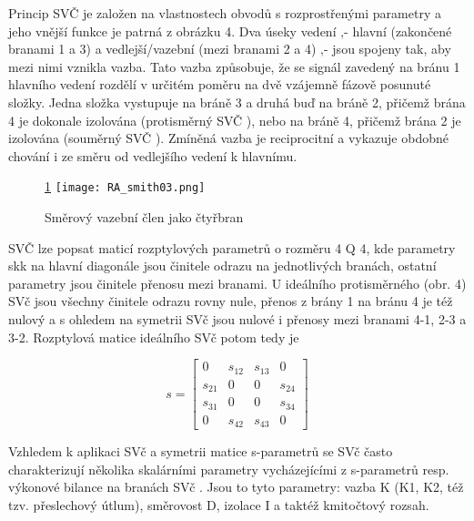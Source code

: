         Princip SVČ je založen na vlastnostech obvodů s rozprostřenými parametry a jeho vnější 
        funkce je patrná z obrázku 4. Dva úseky vedení ‚- hlavní (zakončené branami 1 a 3) a 
        vedlejší/vazební (mezi branami 2 a 4) ‚- jsou spojeny tak, aby mezi nimi vznikla vazba. 
        Tato vazba způsobuje, že se signál zavedený na bránu 1 hlavního vedení rozdělí v určitém 
        poměru na dvě vzájemně fázově posunuté složky. Jedna složka vystupuje na bráně 3 a druhá 
        buď na bráně 2, přičemž brána 4 je dokonale izolována (protisměrný SVČ ), nebo na bráně 4, 
        přičemž brána 2 je izolována (souměrný SVČ ). Zmíněná vazba je reciprocitní a vykazuje 
        obdobné chování i ze směru od vedlejšího vedení k hlavnímu.      
  
        \begin{figure}\ref{fyz:fig0_RA_smith03} 
          \centering
          \texttt{[image: RA\_smith03.png]}
          \caption{Směrový vazební člen jako čtyřbran}
          \label{fyz:fig0_RA_smith03} 
        \end{figure}
  
        SVČ lze popsat maticí rozptylových parametrů o rozměru 4 Q 4, kde parametry skk na hlavní 
        diagonále jsou činitele odrazu na jednotlivých branách, ostatní parametry jsou činitele 
        přenosu mezi branami. U ideálního protisměrného (obr. 4) SVč jsou všechny činitele odrazu 
        rovny nule, přenos z brány 1 na bránu 4 je též nulový a s ohledem na symetrii SVč jsou 
        nulové i přenosy mezi branami 4-1, 2-3 a 3-2. Rozptylová matice ideálního SVč potom tedy je
  
        \begin{equation}\label{RA:eq_smith09}
          s = \left[
            \begin{matrix}
                0    & s_{12} & s_{13} &  0       \\
              s_{21} &   0    &   0    & s_{24}   \\
              s_{31} &   0    &   0    & s_{34}   \\
                0    & s_{42} & s_{43} &  0     
            \end{matrix}
              \right]
        \end{equation} 
  
        Vzhledem k aplikaci SVč a symetrii matice s-parametrů se SVč často charakterizují několika 
        skalárními parametry vycházejícími z s-parametrů resp. výkonové bilance na branách SVč . 
        Jsou to tyto parametry: vazba K (K1, K2, též tzv. přeslechový útlum), směrovost D, izolace 
        I a taktéž kmitočtový rozsah.
  
